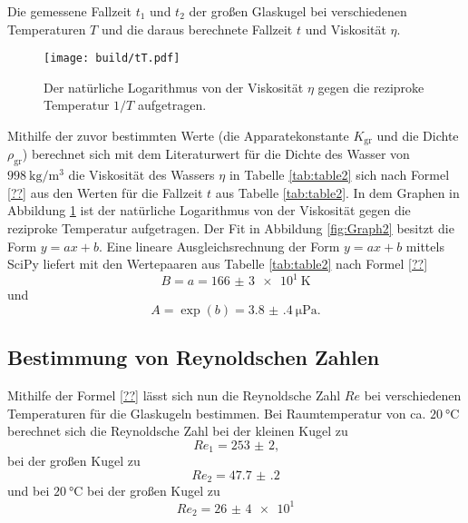 \begin{table}
	\centering
	\caption{Die gemessene Fallzeit $t_1$ und $t_2$ der großen Glaskugel bei verschiedenen Temperaturen $T$ und die daraus berechnete Fallzeit $t$ und Viskosität $\eta$.}
	
\end{table}
\begin{figure}
	\centering
	\caption{Der natürliche Logarithmus von der Viskosität $\eta$ gegen die reziproke Temperatur $1/T$ aufgetragen.}
	\texttt{[image: build/tT.pdf]}
	\label{fig:Graph}
\end{figure}
Mithilfe der zuvor bestimmten Werte (die Apparatekonstante $K_\text{gr}$ und die Dichte $\rho_\text{gr}$) berechnet sich mit dem Literaturwert für die Dichte des Wasser von $\SI{998}{\kilo\gram\per\meter\tothe{3}}$ \cite{eta} die Viskosität des Wassers $\eta$ in Tabelle \ref{tab:table2} sich nach Formel \eqref{??} aus den Werten für die Fallzeit $t$ aus Tabelle \ref{tab:table2}. In dem Graphen in Abbildung \ref{fig:Graph} ist der natürliche Logarithmus von der Viskosität gegen die reziproke Temperatur aufgetragen. 
Der Fit in Abbildung \ref{fig:Graph2} besitzt die Form $y=a x + b$. Eine lineare Ausgleichsrechnung der Form $y=a x + b$ mittels SciPy \cite{scipy} liefert mit den Wertepaaren aus Tabelle \ref{tab:table2} nach Formel \eqref{??}
\begin{displaymath}
	B = a = \SI{166(3)e1}{\kelvin}
\end{displaymath}
und
\begin{displaymath}
	A = \exp(b) = \SI{3.8(4)}{\micro\pascal}\text{.}
\end{displaymath}

\subsection{Bestimmung von Reynoldschen Zahlen}
Mithilfe der Formel \eqref{??} lässt sich nun die Reynoldsche Zahl $Re$ bei verschiedenen Temperaturen für die Glaskugeln bestimmen. Bei Raumtemperatur von ca. $\SI{20}{\degreeCelsius}$ berechnet sich die Reynoldsche Zahl bei der kleinen Kugel zu
\begin{displaymath}
	Re_1 = \num{253(2)}\text{,}
\end{displaymath}
 bei der großen Kugel zu
\begin{displaymath}
	Re_2 = \num{47.7(2)}
\end{displaymath}
und bei $\SI{20}{\degreeCelsius}$ bei der großen Kugel zu
\begin{displaymath}
Re_2 = \num{26(4)e1}
\end{displaymath}
